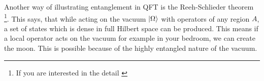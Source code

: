 	
	Another way of illustrating entanglement in QFT is the Reeh-Schlieder theorem \footnote{If you are interested in the detail \cite{StreaterWightman}}. This says, that while acting on the vacuum $\ket{\Omega}$ with operators of any region $A$, a set of states which is dense in full Hilbert space can be produced. This means if a local operator acts on the vacuum for example in your bedroom, we can create the moon. This is possible because of the highly entangled nature of the vacuum.  
	
%	 
	
\FloatBarrier